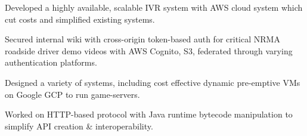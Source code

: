 \documentclass[a4paper]{deedy-resume}
\begin{document}
\begin{minipage}[t]{0.66\textwidth}
\sectionspace



\begin{tightitemize}
\item Developed a highly available, scalable IVR system
	  with AWS cloud system which cut costs and simplified
	  existing systems.
\item Secured internal wiki with cross-origin token-based
	  auth for critical NRMA roadside driver demo videos
	  with AWS Cognito, S3, federated through varying
	  authentication platforms.
\end{tightitemize}

\sectionspace



\begin{tightitemize}
\item Designed a variety of systems, including cost effective
	  dynamic pre-emptive VMs on Google GCP to run game-servers.
\item Worked on HTTP-based protocol with Java runtime bytecode
	  manipulation to simplify API creation \& interoperability.
\end{tightitemize}

\sectionspace

\end{minipage} %
\end{document}
